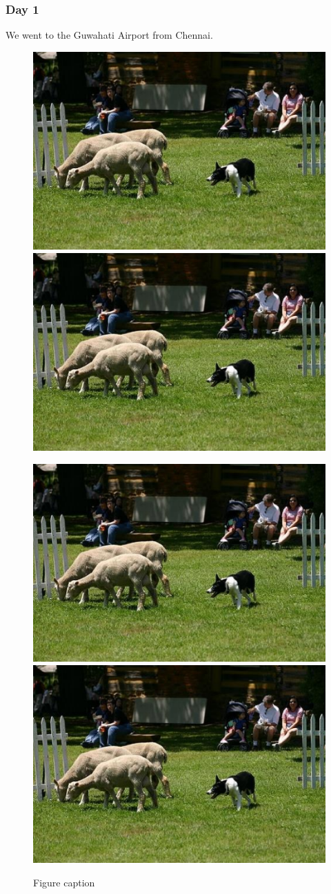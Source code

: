 \documentclass{beamer}
\begin{document}
\begin{frame}
    \frametitle{Day 1}

    We went to the Guwahati Airport from Chennai. 

    \begin{figure}[htp]
        \centering
        \includegraphics[width=.4\textwidth]{img}\qquad
        \includegraphics[width=.4\textwidth]{img}\qquad

        \medskip

        \includegraphics[width=.4\textwidth]{img}\qquad
        \includegraphics[width=.4\textwidth]{img}

        \caption{Figure caption}
        \label{pics:blablabla}
    \end{figure}

\end{frame}
\end{document}
